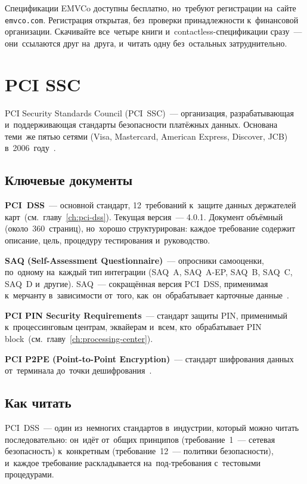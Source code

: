 \begin{practice}
  Спецификации EMVCo доступны бесплатно, но~требуют регистрации
  на~сайте \texttt{emvco.com}. Регистрация открытая, без~проверки
  принадлежности к~финансовой организации. Скачивайте все~четыре
  книги и~contactless-спецификации сразу~--- они~ссылаются друг
  на~друга, и~читать одну без~остальных затруднительно.
\end{practice}


\section{PCI SSC}
\label{sec:ps-pci}

PCI Security Standards Council (PCI~SSC)~--- организация,
разрабатывающая и~поддерживающая стандарты безопасности
платёжных данных. Основана теми~же пятью сетями
(Visa, Mastercard, American Express, Discover, JCB)
в~2006~году~.

\subsection*{Ключевые документы}

\textbf{PCI~DSS}~--- основной стандарт, 12~требований
к~защите данных держателей
карт~(см.~главу~\ref{ch:pci-dss}). Текущая версия~---
4.0.1. Документ объёмный (около~360~страниц), но~хорошо
структурирован: каждое требование содержит описание,
цель, процедуру тестирования и~руководство.

\textbf{SAQ (Self-Assessment Questionnaire)}~--- опросники
самооценки, по~одному на~каждый тип интеграции (SAQ~A,
SAQ~A-EP, SAQ~B, SAQ~C, SAQ~D и~другие). SAQ~--- сокращённая
версия PCI~DSS, применимая к~мерчанту в~зависимости
от~того, как~он~обрабатывает карточные
данные~.

\textbf{PCI PIN Security Requirements}~--- стандарт защиты
PIN, применимый к~процессинговым центрам, эквайерам
и~всем, кто~обрабатывает PIN
block~(см.~главу~\ref{ch:processing-center}).

\textbf{PCI P2PE (Point-to-Point Encryption)}~--- стандарт
шифрования данных от~терминала до~точки
дешифрования~.

\subsection*{Как читать}

PCI~DSS~--- один из~немногих стандартов в~индустрии,
который можно читать последовательно: он~идёт от~общих
принципов (требование~1~--- сетевая безопасность)
к~конкретным (требование~12~--- политики безопасности),
и~каждое требование раскладывается на~под-требования
с~тестовыми процедурами.

